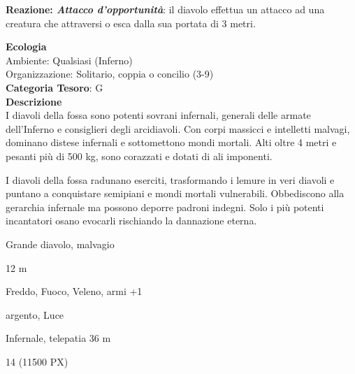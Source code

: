 \begin{multicols}{2}
{\textbf{Reazione: \emph{Attacco d'opportunità}}: il diavolo effettua un attacco ad una creatura che attraversi o esca dalla sua portata di 3 metri.

\textbf{Ecologia}\\
Ambiente: Qualsiasi (Inferno)\\
Organizzazione: Solitario, coppia o concilio (3-9)\\
\textbf{Categoria Tesoro}: G\\
\textbf{Descrizione}\\
I diavoli della fossa sono potenti sovrani infernali, generali delle armate dell'Inferno e consiglieri degli arcidiavoli. Con corpi massicci e intelletti malvagi, dominano distese infernali e sottomettono mondi mortali. Alti oltre 4 metri e pesanti più di 500 kg, sono corazzati e dotati di ali imponenti.

I diavoli della fossa radunano eserciti, trasformando i lemure in veri diavoli e puntano a conquistare semipiani e mondi mortali vulnerabili. Obbediscono alla gerarchia infernale ma possono deporre padroni indegni. Solo i più potenti incantatori osano evocarli rischiando la dannazione eterna.

\begin{description}[noitemsep, topsep=0pt, parsep=0pt, partopsep=0pt, itemsep=1pt, leftmargin=2.35cm,  labelwidth=2.2cm, itemindent=0cm, listparindent=0pt] %
\setlength{\baselineskip}{10pt}
\item[\textbf{Taglia/Tipo}] Grande diavolo, malvagio
\item[\textbf{Caratt.}] 
\item[\textbf{Punti Ferita}] 
\item[\textbf{Movimento}] 12 m
\item[\textbf{Tiri Salvez.}] 
\item[\textbf{Imm. Danni}] Freddo, Fuoco, Veleno, armi +1
\item[\textbf{Vulnerabilità}] argento, Luce
\item[\textbf{Sensi}] 
\item[\textbf{Linguaggi}] Infernale, telepatia 36 m
\item[\textbf{Sfida}] 14 (11500 PX)
\end{description}
\smallskip

}
\end{multicols}

